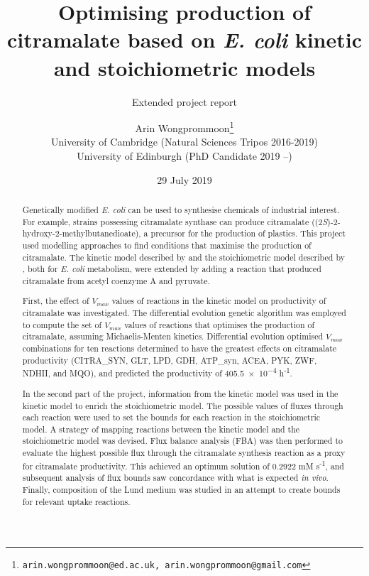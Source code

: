 \documentclass[parskip=full, numbers=noenddot]{scrreprt}
\author{Arin Wongprommoon\thanks{\texttt{arin.wongprommoon@ed.ac.uk, arin.wongprommoon@gmail.com}}
  \\University of Cambridge (Natural Sciences Tripos 2016-2019)
\\University of Edinburgh (PhD Candidate 2019 --)}
\title{Optimising production of citramalate based on \emph{E. coli} kinetic and stoichiometric models}
\subtitle{Extended project report}
\date{29 July 2019}
\begin{document}
\maketitle

\tableofcontents

\begin{abstract}

    Genetically modified \emph{E. coli} can be used to synthesise chemicals of industrial interest. For example, strains possessing citramalate synthase can produce citramalate ((2\emph{S})-2-hydroxy-2-methylbutanedioate), a precursor for the production of plastics.
  This project used modelling approaches to find conditions that maximise the production of citramalate. The kinetic model described by \citet{millard_metabolic_2017} and the stoichiometric model described by \citet{orth_comprehensive_2011}, both for \emph{E. coli} metabolism, were extended by adding a reaction that produced citramalate from acetyl coenzyme A and pyruvate.
  
  First, the effect of $V_{max}$ values of reactions in the kinetic model on productivity of citramalate was investigated. The differential evolution genetic algorithm was employed to compute the set of $V_{max}$ values of reactions that optimises the production of citramalate, assuming Michaelis-Menten kinetics. Differential evolution optimised $V_{max}$ combinations for ten reactions determined to have the greatest effects on citramalate productivity (CITRA\_SYN, GLT, LPD, GDH, ATP\_syn, ACEA, PYK, ZWF, NDHII, and MQO), and predicted the productivity of \num{405.5e-4} h\textsuperscript{-1}.

  In the second part of the project, information from the kinetic model was used in the kinetic model to enrich the stoichiometric model. The possible values of fluxes through each reaction were used to set the bounds for each reaction in the stoichiometric model. A strategy of mapping reactions between the kinetic model and the stoichiometric model was devised. Flux balance analysis (FBA) was then performed to evaluate the highest possible flux through the citramalate synthesis reaction as a proxy for citramalate productivity. This achieved an optimum solution of 0.2922 mM s\textsuperscript{-1}, and subsequent analysis of flux bounds saw concordance with what is expected \emph{in vivo}. Finally, composition of the Lund medium \citep{eastham_process_2015} was studied in an attempt to create bounds for relevant uptake reactions.
  
\end{abstract}
\end{document}
